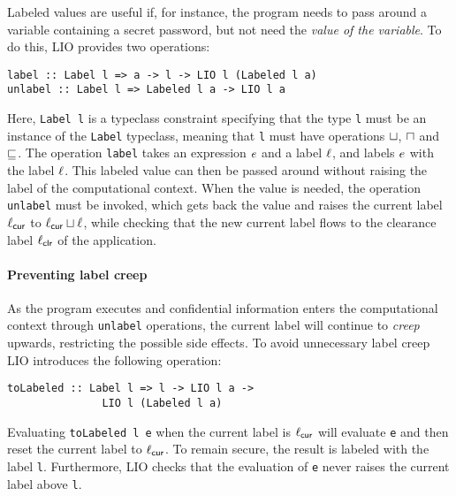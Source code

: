 Labeled values are useful if, for instance, the program needs to pass around a variable containing a secret password, but not need the \emph{value of the variable}.
To do this, LIO provides two operations:
\begin{verbatim}
label :: Label l => a -> l -> LIO l (Labeled l a)
unlabel :: Label l => Labeled l a -> LIO l a
\end{verbatim}
Here, \texttt{Label l} is a typeclass constraint specifying that the type \texttt{l} must be an instance of the \texttt{Label} typeclass, meaning that \texttt{l} must have operations $\sqcup$, $\sqcap$ and $\sqsubseteq$. The operation \texttt{label} takes an expression $e$ and a label $\ell$, and labels $e$ with the label $\ell$. This labeled value can then be passed around without raising the label of the computational context. When the value is needed, the operation \texttt{unlabel} must be invoked, which gets back the value and raises the current label $\ell_{\mathsf{cur}}$ to $\ell_{\mathsf{cur}} \sqcup \ell$, while checking that the new current label flows to the clearance label $\ell_{\mathsf{clr}}$ of the application.

\paragraph{Preventing label creep}
As the program executes and confidential information enters the computational context through \texttt{unlabel} operations, the current label will continue to \emph{creep} upwards, restricting the possible side effects. To avoid unnecessary label creep LIO introduces the following operation:
\begin{verbatim}
toLabeled :: Label l => l -> LIO l a ->
               LIO l (Labeled l a)
\end{verbatim}
Evaluating \texttt{toLabeled l e} when the current label is $\ell_{\mathsf{cur}}$ will evaluate \texttt{e} and then reset the current label to $\ell_{\mathsf{cur}}$. To remain secure, the result is labeled with the label \texttt{l}. Furthermore, LIO checks that the evaluation of \texttt{e} never raises the current label above \texttt{l}.